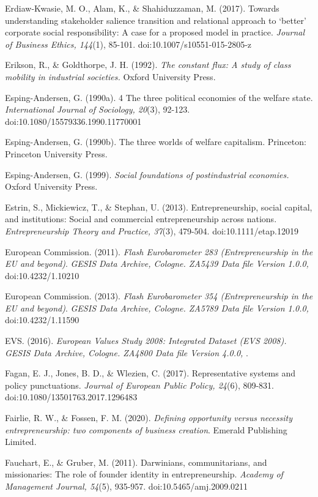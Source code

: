 \documentclass{article}
\begin{document}
Erdiaw-Kwasie, M. O., Alam, K., \& Shahiduzzaman, M. (2017). Towards understanding stakeholder salience transition and relational approach to ‘better' corporate social responsibility: A case for a proposed model in practice. \emph{Journal of Business Ethics, 144}(1), 85-101. doi:10.1007/s10551-015-2805-z

Erikson, R., \& Goldthorpe, J. H. (1992). \emph{The constant flux: A study of class mobility in industrial societies.} Oxford University Press.

Esping-Andersen, G. (1990a). 4 The three political economies of the welfare state. \emph{International Journal of Sociology, 20}(3), 92-123. doi:10.1080/15579336.1990.11770001

Esping-Andersen, G. (1990b). The three worlds of welfare capitalism. Princeton: Princeton University Press.

Esping-Andersen, G. (1999). \emph{Social foundations of }\emph{postindustrial}\emph{ economies.} Oxford University Press.

Estrin, S., Mickiewicz, T., \& Stephan, U. (2013). Entrepreneurship, social capital, and institutions: Social and commercial entrepreneurship across nations. \emph{Entrepreneurship Theory and Practice, 37}(3), 479-504. doi:10.1111/etap.12019

European Commission. (2011). \emph{Flash Eurobarometer 283 (Entrepreneurship in the EU and beyond)}. \emph{GESIS Data Archive, Cologne. ZA5439 Data file Version 1.0.0, }doi:10.4232/1.10210

European Commission. (2013). \emph{Flash Eurobarometer 354 (Entrepreneurship in the EU and beyond)}. \emph{GESIS Data Archive, Cologne. ZA5789 Data file Version 1.0.0, }doi:10.4232/1.11590

EVS. (2016). \emph{European Values Study 2008: Integrated Dataset (EVS 2008). GESIS Data Archive, Cologne. ZA4800 Data file Version 4.0.0}\emph{, }. 

Fagan, E. J., Jones, B. D., \& Wlezien, C. (2017). Representative systems and policy punctuations. \emph{Journal of European Public Policy, 24}(6), 809-831. doi:10.1080/13501763.2017.1296483

Fairlie, R. W., \& Fossen, F. M. (2020). \emph{Defining opportunity versus necessity entrepreneurship: two components of business creation}. Emerald Publishing Limited.

Fauchart, E., \& Gruber, M. (2011). Darwinians, communitarians, and missionaries: The role of founder identity in entrepreneurship. \emph{Academy of Management Journal, 54}(5), 935-957. doi:10.5465/amj.2009.0211
\end{document}
